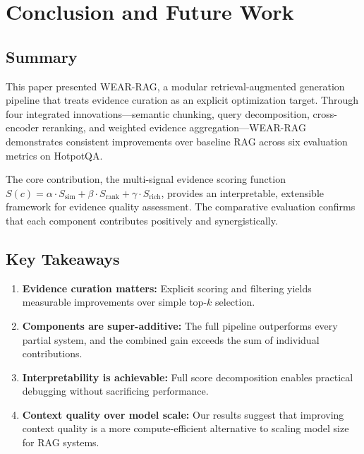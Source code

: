\documentclass[conference]{IEEEtran}
\begin{document}
\section{Conclusion and Future Work}

\subsection{Summary}
This paper presented WEAR-RAG, a modular retrieval-augmented generation pipeline that treats evidence curation as an explicit optimization target. Through four integrated innovations---semantic chunking, query decomposition, cross-encoder reranking, and weighted evidence aggregation---WEAR-RAG demonstrates consistent improvements over baseline RAG across six evaluation metrics on HotpotQA.

The core contribution, the multi-signal evidence scoring function $S(c) = \alpha \cdot S_{\text{sim}} + \beta \cdot S_{\text{rank}} + \gamma \cdot S_{\text{rich}}$, provides an interpretable, extensible framework for evidence quality assessment. The comparative evaluation confirms that each component contributes positively and synergistically.

\subsection{Key Takeaways}
\begin{enumerate}[leftmargin=*]
\item \textbf{Evidence curation matters:} Explicit scoring and filtering yields measurable improvements over simple top-$k$ selection.
\item \textbf{Components are super-additive:} The full pipeline outperforms every partial system, and the combined gain exceeds the sum of individual contributions.
\item \textbf{Interpretability is achievable:} Full score decomposition enables practical debugging without sacrificing performance.
\item \textbf{Context quality over model scale:} Our results suggest that improving context quality is a more compute-efficient alternative to scaling model size for RAG systems.
\end{enumerate}
\end{document}

